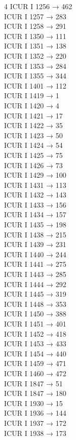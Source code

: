 \begin{multicols}{4}
ICUR I 1256 → 462\\
ICUR I 1257 → 283\\
ICUR I 1258 → 291\\
ICUR I 1350 → 111\\
ICUR I 1351 → 138\\
ICUR I 1352 → 220\\
ICUR I 1353 → 284\\
ICUR I 1355 → 344\\
ICUR I 1401 → 112\\
ICUR I 1419 → 1\\
ICUR I 1420 → 4\\
ICUR I 1421 → 17\\
ICUR I 1422 → 35\\
ICUR I 1423 → 50\\
ICUR I 1424 → 54\\
ICUR I 1425 → 75\\
ICUR I 1426 → 73\\
ICUR I 1429 → 100\\
ICUR I 1431 → 113\\
ICUR I 1432 → 143\\
ICUR I 1433 → 156\\
ICUR I 1434 → 157\\
ICUR I 1435 → 198\\
ICUR I 1438 → 215\\
ICUR I 1439 → 231\\
ICUR I 1440 → 244\\
ICUR I 1441 → 275\\
ICUR I 1443 → 285\\
ICUR I 1444 → 292\\
ICUR I 1445 → 319\\
ICUR I 1448 → 353\\
ICUR I 1450 → 388\\
ICUR I 1451 → 401\\
ICUR I 1452 → 418\\
ICUR I 1453 → 433\\
ICUR I 1454 → 440\\
ICUR I 1459 → 471\\
ICUR I 1460 → 472\\
ICUR I 1847 → 51\\
ICUR I 1847 → 180\\
ICUR I 1930 → 15\\
ICUR I 1936 → 144\\
ICUR I 1937 → 172\\
ICUR I 1938 → 173\\

\end{multicols}
